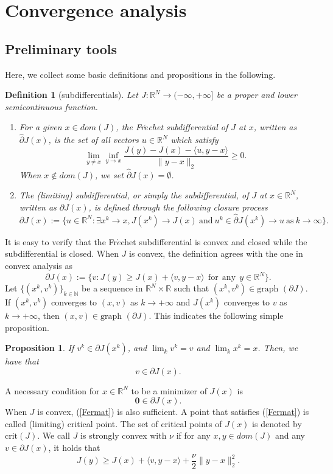 \documentclass[12pt]{article}
\newtheorem{proposition}{Proposition}
\newtheorem{definition}{Definition}
\begin{document}
\section{Convergence analysis}
\subsection{Preliminary tools}
Here, we collect some basic definitions and propositions in the following.
\begin{definition}[subdifferentials\cite{mordukhovich2006variational,rockafellar2009variational}] Let  $J: \mathbb{R}^N \rightarrow (-\infty, +\infty]$ be a proper and lower semicontinuous function.
\begin{enumerate}
  \item For a given $x\in dom (J)$, the Fr$\acute{e}$chet subdifferential of $J$ at $x$, written as $\hat{\partial}J (x)$, is the set of all vectors $u\in \mathbb{R}^N$ which satisfy
  $$\lim_{y\neq x}\inf_{y\rightarrow x}\frac{J(y)-J(x)-\langle u, y-x\rangle}{\|y-x\|_2}\geq 0.$$
When $x\notin dom (J)$, we set $\hat{\partial}J(x)=\emptyset$.

\item The (limiting) subdifferential, or simply the subdifferential, of $J$ at $x\in \mathbb{R}^N$, written as $\partial J(x)$, is defined through the following closure process
$$\partial J(x):=\{u\in\mathbb{R}^N: \exists x^k\rightarrow x, J(x^k)\rightarrow J(x)~\textrm{and}~ u^k\in \hat{\partial}J(x^k)\rightarrow u~\textrm{as}~k\rightarrow \infty\}.$$
\end{enumerate}
\end{definition}
It is easy to verify that the Fr$\acute{e}$chet subdifferential is convex and closed while the subdifferential is closed. When $J$ is convex,  the definition agrees with the one in convex analysis \cite{rockafellar2015convex} as
$$\partial J(x):=\{v: J(y)\geq J(x)+\langle v,y-x\rangle~~\textrm{for}~~\textrm{any}~~y\in \mathbb{R}^N\}.$$
Let $\{(x^k,v^k)\}_{k\in \mathbb{N}}$ be a sequence in $\mathbb{R}^N\times \mathbb{R}$ such that $(x^k,v^k)\in \textrm{graph }(\partial J)$. If $(x^k,v^k)$  converges to $(x, v)$ as $k\rightarrow +\infty$ and $J(x^k)$ converges to $v$ as $k\rightarrow +\infty$, then $(x, v)\in \textrm{graph }(\partial J)$. This indicates the following simple proposition.
\begin{proposition}\label{sublimit}
If $v^k\in \partial J(x^k)$, and $\lim_{k}v^k=v$ and $\lim_{k}x^k=x$. Then, we have that
\begin{equation}
    v\in \partial J(x).
\end{equation}
\end{proposition}
A necessary condition for $x\in\mathbb{R}^N$ to be a minimizer of $J(x)$ is
\begin{equation}\label{Fermat}
\textbf{0}\in \partial J(x).
\end{equation}
When $J$ is convex, (\ref{Fermat}) is also sufficient. A point that satisfies (\ref{Fermat}) is called (limiting) critical point. The set of critical points of $J(x)$ is denoted by $\textrm{crit}(J)$.
We call $J$ is strongly convex with $\nu$ if for any $x,y\in dom(J)$ and any $v\in \partial J(x)$, it holds that
$$J(y)\geq J(x)+\langle v,y-x\rangle+\frac{\nu}{2}\|y-x\|_2^2.$$
\end{document}
